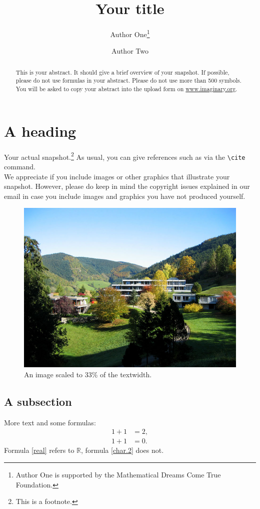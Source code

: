 \documentclass{snapshotmfo}
\author{Author One\thanks{Author One is supported by the Mathematical Dreams Come True Foundation.} \and Author Two}
\title{Your title}
\begin{document}
\begin{abstract}
This is your abstract. It should give a brief overview of your snapshot. If possible, please do not use formulas in your abstract. Please do not use more than 500 symbols. You will be asked to copy your abstract into the upload form on \href{http://www.imaginary.org}{www.imaginary.org}. 
\end{abstract}

\section{A heading}
Your actual snapshot.\footnote{This is a footnote.} As usual, you can give references such as \cite{snapshot, knuth1986texbook, wikiMath, sample13, sample12, sample11, sample14} via the \verb+\cite+ command.\\

We appreciate if you include images or other graphics that illustrate your snapshot. However, please do keep in mind the copyright issues explained in our email in case you include images and graphics you have not produced yourself.

\begin{figure}[h]
        \centering 
        \includegraphics[width= 0.33 \textwidth]{mfo.jpg}
        \caption{An image scaled to 33\% of the textwidth.}
\label{fig:sample-image}
\end{figure}

\subsection{A subsection}
More text and some formulas:
\begin{align}\label{real}
1+1&=2,\\\label{char.2}
1+1&=0.
\end{align}
Formula \eqref{real} refers to $\mathbb{R}$, formula \eqref{char.2} does not.
\end{document}
